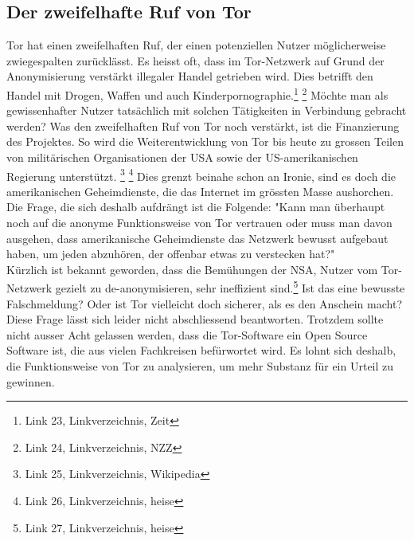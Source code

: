 \subsection{Der zweifelhafte Ruf von Tor}
Tor hat einen zweifelhaften Ruf, der einen potenziellen Nutzer möglicherweise zwiegespalten zurücklässt.
Es heisst oft, dass im Tor-Netzwerk auf Grund der Anonymisierung verstärkt illegaler Handel getrieben wird.
Dies betrifft den Handel mit Drogen, Waffen und auch Kinderpornographie.\footnote{Link 23, Linkverzeichnis, Zeit} \footnote{Link 24, Linkverzeichnis, NZZ}
Möchte man als gewissenhafter Nutzer tatsächlich mit solchen Tätigkeiten in Verbindung gebracht werden?
Was den zweifelhaften Ruf von Tor noch verstärkt, ist die Finanzierung des Projektes.
So wird die Weiterentwicklung von Tor bis heute zu grossen Teilen von militärischen Organisationen der USA sowie der US-amerikanischen Regierung  unterstützt.
\footnote{Link 25, Linkverzeichnis, Wikipedia}
\footnote{Link 26, Linkverzeichnis, heise}
Dies grenzt beinahe schon an Ironie, sind es doch die amerikanischen Geheimdienste, die das Internet im grössten Masse aushorchen. Die Frage, die sich deshalb aufdrängt ist die Folgende: "Kann man überhaupt noch auf die anonyme Funktionsweise von Tor vertrauen oder muss man davon ausgehen, dass amerikanische Geheimdienste das Netzwerk bewusst aufgebaut haben, um jeden abzuhören, der offenbar etwas zu verstecken hat?"
\\
Kürzlich ist bekannt geworden, dass die Bemühungen der NSA, Nutzer vom Tor-Netzwerk gezielt zu de-anonymisieren, sehr ineffizient sind.\footnote{Link 27, Linkverzeichnis, heise}
Ist das eine bewusste Falschmeldung? Oder ist Tor vielleicht doch sicherer, als es den Anschein macht? Diese Frage lässt sich leider nicht abschliessend beantworten. Trotzdem sollte nicht ausser Acht gelassen werden, dass die Tor-Software ein Open Source Software ist, die aus vielen Fachkreisen befürwortet wird. Es lohnt sich deshalb, die Funktionsweise von Tor zu analysieren, um mehr Substanz für ein Urteil zu gewinnen.

